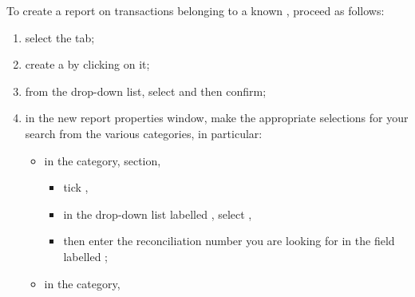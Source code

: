 To create a report on transactions belonging to a known , proceed as follows:
\begin{enumerate}
	\item select the  tab;
	\item create a  by clicking on it;
	\item from the  drop-down list, select  and then confirm;
	\item in the new report properties window, make the appropriate selections for your search from the various categories, in particular:
	\begin{itemize}
		\item in the  category,  section,
		\begin{itemize}
				\item tick ,
				\item in the drop-down list labelled , select ,
				\item then enter the reconciliation number you are looking for in the field labelled ;
		\end{itemize}
		\item in the  category,

\end{itemize}
\end{enumerate}
